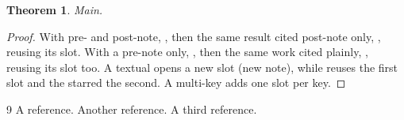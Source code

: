 \documentclass{article}
\newtheorem{theorem}{Theorem}
\begin{document}
\begin{theorem}\label{thm:main}Main.\end{theorem}
\begin{proof}
  With pre- and post-note, \cite[see][Section 3]{Lachal_Class_2011}, then the
  same result cited post-note only, \cite[Section 3]{Lachal_Class_2011},
  reusing its slot.
  With a pre-note only, \cite[see][]{Other_Work_2020}, then the same work
  cited plainly, \cite{Other_Work_2020}, reusing its slot too.
  A textual \citet[Section 4]{Lachal_Class_2011} opens a new slot (new note),
  while \citep[cf.][Section 3]{Lachal_Class_2011} reuses the first slot and
  the starred \citep*{Other_Work_2020} the second.
  A multi-key \citep{Lachal_Class_2011,Third_Item_1999} adds one slot per key.
\end{proof}

\begin{thebibliography}{9}
A reference.
Another reference.
A third reference.
\end{thebibliography}
\end{document}
